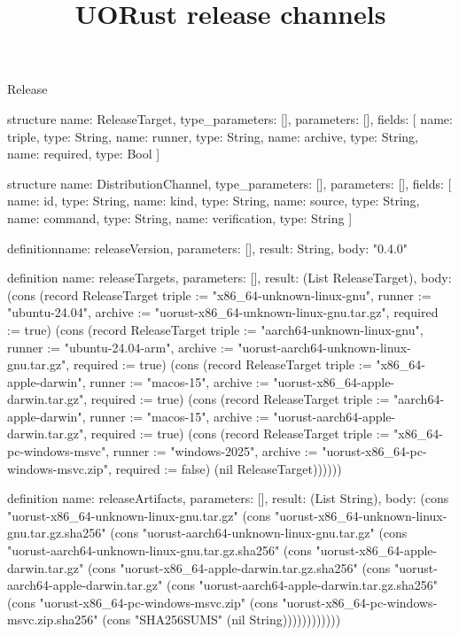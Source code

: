 \begin{lexlean}{Release}
\title{UORust release channels}
\begin{semanticmodule}
structure{
  name: ReleaseTarget,
  type_parameters: [],
  parameters: [],
  fields: [
    {name: triple, type: String},
    {name: runner, type: String},
    {name: archive, type: String},
    {name: required, type: Bool}
  ]
}

structure{
  name: DistributionChannel,
  type_parameters: [],
  parameters: [],
  fields: [
    {name: id, type: String},
    {name: kind, type: String},
    {name: source, type: String},
    {name: command, type: String},
    {name: verification, type: String}
  ]
}

definition{name: releaseVersion, parameters: [], result: String, body: "0.4.0"}

definition{
  name: releaseTargets,
  parameters: [],
  result: (List ReleaseTarget),
  body: (cons (record ReleaseTarget {triple := "x86_64-unknown-linux-gnu", runner := "ubuntu-24.04", archive := "uorust-x86_64-unknown-linux-gnu.tar.gz", required := true}) (cons (record ReleaseTarget {triple := "aarch64-unknown-linux-gnu", runner := "ubuntu-24.04-arm", archive := "uorust-aarch64-unknown-linux-gnu.tar.gz", required := true}) (cons (record ReleaseTarget {triple := "x86_64-apple-darwin", runner := "macos-15", archive := "uorust-x86_64-apple-darwin.tar.gz", required := true}) (cons (record ReleaseTarget {triple := "aarch64-apple-darwin", runner := "macos-15", archive := "uorust-aarch64-apple-darwin.tar.gz", required := true}) (cons (record ReleaseTarget {triple := "x86_64-pc-windows-msvc", runner := "windows-2025", archive := "uorust-x86_64-pc-windows-msvc.zip", required := false}) (nil ReleaseTarget))))))
}

definition{
  name: releaseArtifacts,
  parameters: [],
  result: (List String),
  body: (cons "uorust-x86_64-unknown-linux-gnu.tar.gz" (cons "uorust-x86_64-unknown-linux-gnu.tar.gz.sha256" (cons "uorust-aarch64-unknown-linux-gnu.tar.gz" (cons "uorust-aarch64-unknown-linux-gnu.tar.gz.sha256" (cons "uorust-x86_64-apple-darwin.tar.gz" (cons "uorust-x86_64-apple-darwin.tar.gz.sha256" (cons "uorust-aarch64-apple-darwin.tar.gz" (cons "uorust-aarch64-apple-darwin.tar.gz.sha256" (cons "uorust-x86_64-pc-windows-msvc.zip" (cons "uorust-x86_64-pc-windows-msvc.zip.sha256" (cons "SHA256SUMS" (nil String))))))))))))
}


\end{semanticmodule}
\end{lexlean}
